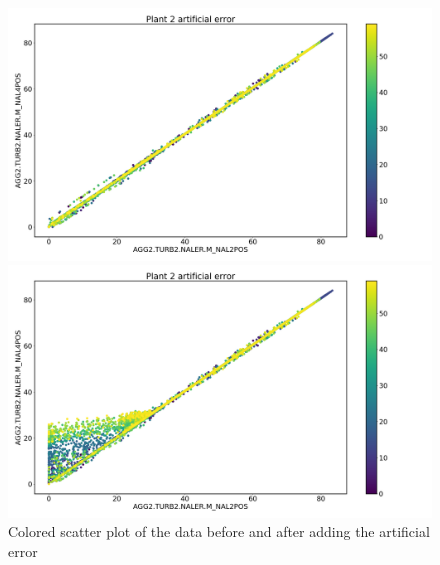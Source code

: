         \begin{figure}
            \begin{minipage}[b]{0.5\linewidth}
                \centering
                \includegraphics[width = \textwidth]{report/figures/analysis/artificial error/original_data.png}
            \end{minipage}
            \begin{minipage}[b]{0.5\linewidth}
                \centering
                \includegraphics[width = \textwidth]{report/figures/analysis/artificial error/plant2_artificial_error_scatter_colored.png}
            \end{minipage}
            \caption{Colored scatter plot of the data before and after adding the artificial error}
            \label{fig:plant2_arti_error}
        \end{figure}
        
